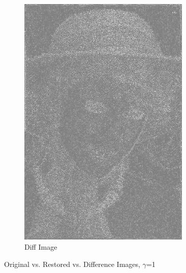 \documentclass{article}
\begin{document}
\begin{figure}[!htb]
\begin{subfigure}{0.3\textwidth}
					\includegraphics[width=0.9\textwidth]{img03y_diff_2.png}
					\caption{Diff Image}
				\end{subfigure}
				\caption{Original vs. Restored vs. Difference Images, $\gamma$=1}
			\end{figure}
\end{document}

